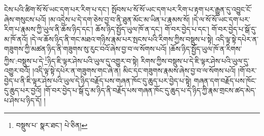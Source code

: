 ངེས་པའི་ཚིག་སོ་སོ་ཡང་དག་པར་རིག་པ་དང་། སྤོབས་པ་སོ་སོ་ཡང་དག་པར་རིག་པ་རྟག་པར་རྒྱུན་དུ་འབྱུང་ངོ་ཞེས་གསུངས་པའོ། །མ་འདྲེས་པ་དེ་དག་ཅེས་བྱ་བ་ནི་ཐུན་མོང་མ་ཡིན་པ་རྣམས་སོ། །དེ་ལ་སོ་སོ་ཡང་དག་པར་རིག་པ་རྣམས་ཀྱི་ཡུལ་ནི་ཆོས་ཉིད་དང་། ཆོས་ཉིད་སྤྱོད་ཡུལ་ཁོ་ན་དང་། གོ་བར་བྱེད་པ་དང་། གོ་བར་བྱེད་པ་སྒོ་དུ་མ་ཁོ་ནའོ། །དེ་ལ་ཆོས་ཉིད་ནི་གང་མཐའ་གཉིས་རྣམ་པར་སྤངས་པའི་རིགས་ཀྱིས་བསྡུས་པ་སྟེ། འདི་ལྟ་སྟེ་དཔེར་ན་གཟུགས་ཀྱི་མཚན་ཉིད་ནི་གཟུགས་སུ་རུང་བའོ་ཞེས་བྱ་བ་ལ་སོགས་པའོ། །ཆོས་ཉིད་སྤྱོད་ཡུལ་ཁོ་ན་རིགས་ཀྱིས་:བསྡུས་པ་དེ་\footnote{བསྡུས་པ་  སྣར་ཐང་།  པེ་ཅིན། }ཉིད་ཇི་ལྟར་ཤེས་པའི་ཡུལ་དུ་འགྱུར་བ་སྟེ། རིགས་ཀྱིས་བསྡུས་པ་དེ་ཇི་ལྟར་ཤེས་པའི་ཡུལ་དུ་འགྱུར་བའོ། །འདི་ལྟ་སྟེ་དཔེར་ན་གཟུགས་གང་ཞེ་ན། མིང་དང་གཟུགས་རྣམས་ཞེས་བྱ་བ་ལ་སོགས་པའོ། །གོ་བར་བྱེད་པ་ནི་ཇི་ལྟར་ཤེས་པའི་ཡུལ་དེ་ཉིད་བརྗོད་པས་གཞན་ཁོང་དུ་ཆུད་པར་བྱེད་པ་སྟེ། གཞན་དག་བརྗོད་པས་ཁོང་དུ་ཆུད་པར་བྱའོ། །གོ་བར་བྱེད་པ་སྒོ་དུ་མ་ཉིད་ནི་བརྗོད་པས་གཞན་ཁོང་དུ་ཆུད་པ་དེ་ཉིད་ཀྱི་རྣམ་གྲངས་ཚད་མེད་པ་ཤེས་པ་ཉིད་དོ། །
